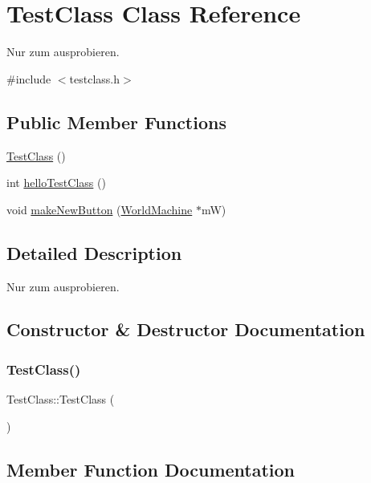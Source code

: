 \hypertarget{class_test_class}{}\section{Test\+Class Class Reference}
\label{class_test_class}


Nur zum ausprobieren.  




{\ttfamily \#include $<$testclass.\+h$>$}

\subsection*{Public Member Functions}
\begin{DoxyCompactItemize}
\item 
\mbox{\hyperlink{class_test_class_a09903432ed60c7c38f1beccc4cf18987}{Test\+Class}} ()
\item 
int \mbox{\hyperlink{class_test_class_a842a304e200248cadf04d06126b51124}{hello\+Test\+Class}} ()
\item 
void \mbox{\hyperlink{class_test_class_a3a11769246ee3997da85854f86ee1727}{make\+New\+Button}} (\mbox{\hyperlink{class_world_machine}{World\+Machine}} $\ast$mW)
\end{DoxyCompactItemize}


\subsection{Detailed Description}
Nur zum ausprobieren. 

\subsection{Constructor \& Destructor Documentation}
\mbox{\label{class_test_class_a09903432ed60c7c38f1beccc4cf18987}} 
\subsubsection{\texorpdfstring{Test\+Class()}{TestClass()}}
{\footnotesize\ttfamily Test\+Class\+::\+Test\+Class (\begin{DoxyParamCaption}{ }\end{DoxyParamCaption})}



\subsection{Member Function Documentation}
\mbox{\label{class_test_class_a842a304e200248cadf04d06126b51124}} 
